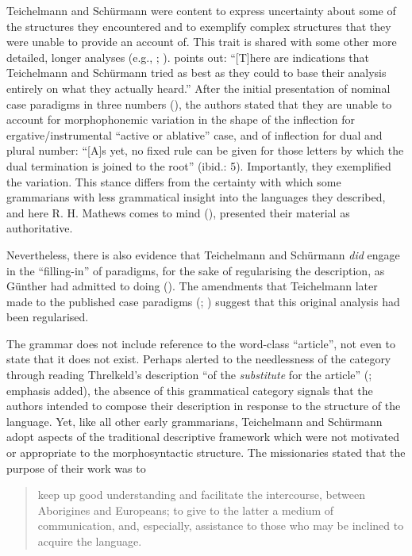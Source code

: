 Teichelmann and Schürmann were content to express uncertainty about some of the structures they encountered and to exemplify complex structures that they were unable to provide an account of. This trait is shared with some other more detailed, longer analyses (e.g., \citealt{kempe_grammar_1891}; ). \citet[106]{amery_warrabarna_2016} points out: “[T]here are indications that Teichelmann and Schürmann tried as best as they could to base their analysis entirely on what they actually heard.” After the initial presentation of nominal case paradigms in three numbers (\citeyear[5--6]{teichelmann_outlines_1840}), the authors stated that they are unable to account for morphophonemic variation in the shape of the inflection for ergative/instrumental “active or ablative” case, and of inflection for dual and plural number: “[A]s yet, no fixed rule can be given for those letters by which the dual termination is joined to the root” (ibid.: 5). Importantly, they exemplified the variation. This stance differs from the certainty with which some grammarians with less grammatical insight into the languages they described, and here R. H. Mathews comes to mind (), presented their material as authoritative.

Nevertheless, there is also evidence that Teichelmann and Schürmann \textit{did} engage in the “filling-in” of paradigms, for the sake of regularising the description, as Günther had admitted to doing (\citeyear[350]{gunther_lecture_1840}). The amendments that Teichelmann later made to the published case paradigms (\citeyear{teichelmann_verb_1858}; ) suggest that this original analysis \citep{teichelmann_outlines_1840} had been regularised.

The grammar does not include reference to the word-class ``article'', not even to state that it does not exist. Perhaps alerted to the needlessness of the category through reading Threlkeld’s description “of the \textit{substitute} for the article” (\citeyear[9]{threlkeld_australian_1834}; emphasis added), the absence of this grammatical category signals that the authors intended to compose their description in response to the structure of the language. Yet, like all other early grammarians, Teichelmann and Schürmann adopt aspects of the traditional descriptive framework which were not motivated or appropriate to the morphosyntactic structure. The missionaries stated that the purpose of their work was to 

\begin{quote}
    keep up good understanding and facilitate the intercourse, between Aborigines and Europeans; to give to the latter a medium of communication, and, especially, assistance to those who may be inclined to acquire the language. \citep[iv]{teichelmann_outlines_1840}
\end{quote}

